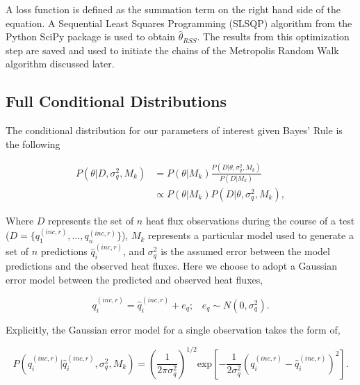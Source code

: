 \documentclass[article]{proc}
\begin{document}
        \noindent A loss function is defined as the summation term on the right hand side of the equation. A Sequential Least Squares Programming (SLSQP) algorithm from the Python SciPy package is used to obtain $\hat{\theta}_{RSS}$. The results from this optimization step are saved and used to initiate the chains of the Metropolis Random Walk algorithm discussed later. 


    \subsection{Full Conditional Distributions}

        The conditional distribution for our parameters of interest given Bayes' Rule is the following

        \begin{align}\label{eq:bayes}
            P(\theta | D, \sigma_q^2, M_k) &= P(\theta|M_k) \frac{P(D|\theta, \sigma_q^2, M_k)}{P(D|M_k)}\\
                &\propto P(\theta|M_k) P(D|\theta, \sigma_q^2, M_k),
        \end{align}

        \noindent Where $D$ represents the set of $n$ heat flux observations during the course of a test ($D = \{q^{(inc,r)}_1, \dots, q^{(inc,r)}_n \}$), $M_k$ represents a particular model used to generate a set of $n$ predictions $\hat{q}^{(inc,r)}_i$, and $\sigma_q^2$ is the assumed error between the model predictions and the observed heat fluxes. Here we choose to adopt a Gaussian error model between the predicted and observed heat fluxes,

        \begin{equation}\label{eq:model}
            q^{(inc,r)}_i = \hat{q}^{(inc,r)}_i + e_q; \hspace{10pt} e_q \sim N(0, \sigma_q^2). 
        \end{equation}

        \noindent Explicitly, the Gaussian error model for a single observation takes the form of, 

        \begin{equation}\label{eq:likelihood}
            P(q_i^{(inc,r)}| \hat{q}_i^{(inc,r)}, \sigma_q^2, M_k) = \left(\frac{1}{2 \pi \sigma_q^2} \right)^{1/2} \text{exp} \left[-\frac{1}{2 \sigma_q^2} \left( q_i^{(inc,r)} - \hat{q}_i^{(inc,r)} \right)^2 \right].
        \end{equation}
\end{document}
